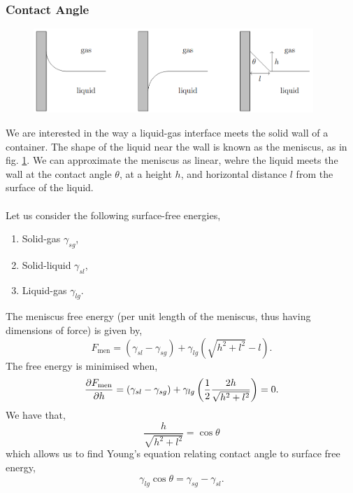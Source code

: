 \documentclass{book}
\begin{document}
\subsubsection{Contact Angle}
\begin{figure}
	\centering
	\includegraphics[width=400px]{contactangle.png}
	\caption{}\label{fig:contactangle}
\end{figure}
We are interested in the way a liquid-gas interface meets the solid wall of a container. The shape of the liquid near the wall is known as the meniscus, as in fig. \ref{fig:contactangle}. We can approximate the meniscus as linear, wehre the liquid meets the wall at the contact angle $\theta$, at a height $h$, and horizontal distance $l$ from the surface of the liquid.
\\\\
Let us consider the following surface-free energies,
\begin{enumerate}
	\item Solid-gas $\gamma_{sg}$,
	\item Solid-liquid $\gamma_{sl}$,
	\item Liquid-gas $\gamma_{lg}$.
\end{enumerate}
The meniscus free energy (per unit length of the meniscus, thus having dimensions of force) is given by,
\begin{equation}
	F_{\text{men}} = \left(\gamma_{sl} - \gamma_{sg}\right) + \gamma_{lg}\left(\sqrt{h^2 + l^2} - l\right).
\end{equation}
The free energy is minimised when,
\begin{equation}
	\pdv{F_{\text{men}}}{h} = \left(\gamma_{sl} - \gamma_{sg}\right) + \gamma_{lg}\left(\frac{1}{2}\frac{2h}{\sqrt{h^2 + l^2}}\right) = 0.
\end{equation}
We have that, 
\begin{equation}
	\frac{h}{\sqrt{h^2 + l^2}} = \cos\theta 
\end{equation}
which allows us to find Young's equation relating contact angle to surface free energy,
\begin{equation}
	\boxed{\gamma_{lg}\cos\theta = \gamma_{sg}-\gamma_{sl}}.
\end{equation}
\end{document}
